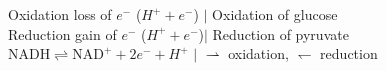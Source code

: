Oxidation loss of $e^-$ ($H^+ + e^-$) $\vert$ Oxidation of glucose \\
Reduction gain of $e^-$ ($H^+ + e^-$)$\vert$ Reduction of pyruvate\\

$\text{NADH}\rightleftharpoons \text{NAD}^+ + 2e^- + H^+$ $\vert$ $\rightharpoonup$ oxidation, $\leftharpoondown$ reduction
